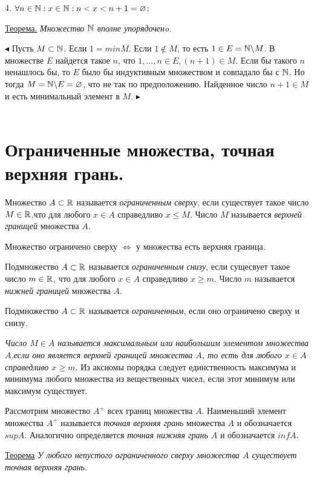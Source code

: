  4. $\forall n \in \mathbb{N}: {x \in \mathbb{N}: n < x < n + 1} = \varnothing$;
 
 \underline{Теорема.}\textit{ Множество $\mathbb{N}$ вполне упорядоченo.}
 
 $\blacktriangleleft$ Пусть $M \subset \mathbb{N}$. Если $1 = min M$. Если $1 \notin M$, то есть $1 \in E=\mathbb{N}\backslash M$. В множестве $E$ найдется такое $n$, что $1,...,n \in E, (n + 1) \in M$. Если бы такого $n$ ненашлось бы, то $E$ было бы индуктивным множеством и совпадало бы с $\mathbb{N}$. Но тогда $M = \mathbb{N} \backslash E = \varnothing$, что не так по предположению. 
 Найденное число $n + 1 \in M$ и есть минимальный элемент в $M$. $\blacktriangleright$
 \\
 \\
 

\section{Ограниченные множества, точная верхняя грань.}

Множество $A \subset \mathbb{R}$ называется \textit{ограниченным сверху}, если существует такое число $M \in \mathbb{R}$,что для любого $x \in A$ справедливо $x \leq M$. Число $M$ называется \textit{верхней границей} множества $A$.

Множество ограничено сверху $\Leftrightarrow$ у множества есть верхняя граница.

Подмножество $A \subset \mathbb{R}$ называется \textit{ограниченным снизу}, если сущесвует такое число $m \in \mathbb{R}$, что для любого $x \in A$ справедливо $x \geq m$.
Число $m$ называется \textit{нижней границей} множества $A$.

Подмножество $A \subset \mathbb{R}$ называется \textit{ограниченным}, если оно ограничено сверху и снизу.

\textit{Число $M \in A$ называется максимальным или наибольшим элементом множества $A$,если оно является верхней границей множества $A$, то есть для любого $x \in A$ справедливо $x \geq m$.} Из аксиомы порядка следует единственность максимума и минимума любого множества из вещественных чисел, если этот минимум или максимум существует.

Рассмотрим множество $A^+$ всех границ множества $A$. Наименьший элемент множества $A^+$ называется \textit{точная верхняя грань} множества $A$ и обозначается $sup A$. Аналогично определяется \textit{точная нижняя грань $A$} и обозначается $inf A$.

\underline{Теорема} \textit{У любого непустого ограниченного сверху множества $A$ существует точная верхняя грань.}

